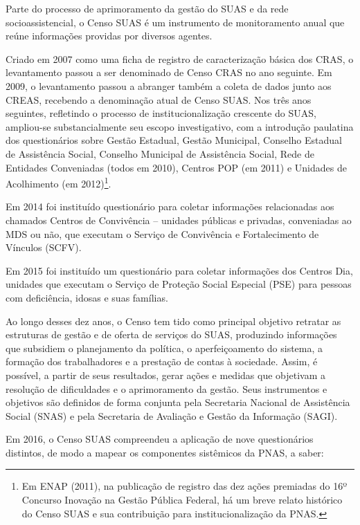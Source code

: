 \documentclass[brazilian]{report}
\begin{document}
Parte do processo de aprimoramento da gestão do SUAS e da rede socioassistencial, o Censo SUAS é um instrumento de monitoramento anual que reúne informações providas por diversos agentes.

Criado em 2007 como uma ficha de registro de caracterização básica dos CRAS, o levantamento passou a ser denominado de Censo CRAS no ano seguinte. Em 2009, o levantamento passou a abranger também a coleta de dados junto aos CREAS, recebendo a denominação atual de Censo SUAS. Nos três anos seguintes, refletindo o processo de institucionalização crescente do SUAS, ampliou-se substancialmente seu escopo investigativo, com a introdução paulatina dos questionários sobre Gestão Estadual, Gestão Municipal, Conselho Estadual de Assistência Social, Conselho Municipal de Assistência Social, Rede de Entidades Conveniadas (todos em 2010), Centros POP (em 2011) e Unidades de Acolhimento (em 2012)\footnote{Em ENAP (2011), na publicação de registro das dez ações premiadas do 16º Concurso Inovação na Gestão Pública Federal, há um breve relato histórico do Censo SUAS e sua contribuição para institucionalização da PNAS.}.

Em 2014 foi instituído questionário para coletar informações relacionadas aos chamados Centros de Convivência – unidades públicas e privadas, conveniadas ao MDS ou não, que executam o Serviço de Convivência e Fortalecimento de Vínculos (SCFV).

Em 2015 foi instituído um questionário para coletar informações dos Centros Dia, unidades que executam o Serviço de Proteção Social Especial (PSE) para pessoas com deficiência, idosas e suas famílias.

Ao longo desses dez anos, o Censo tem tido como principal objetivo retratar as estruturas de gestão e de oferta de serviços do SUAS, produzindo informações que subsidiem o planejamento da política, o aperfeiçoamento do sistema, a formação dos trabalhadores e a prestação de contas à sociedade. Assim, é possível, a partir de seus resultados, gerar ações e medidas que objetivam a resolução de dificuldades e o aprimoramento da gestão. Seus instrumentos e objetivos são definidos de forma conjunta pela Secretaria Nacional de Assistência Social (SNAS) e pela Secretaria de Avaliação e Gestão da Informação (SAGI).

Em 2016, o Censo SUAS compreendeu a aplicação de nove questionários distintos, de modo a mapear os componentes sistêmicos da PNAS, a saber:
\end{document}
